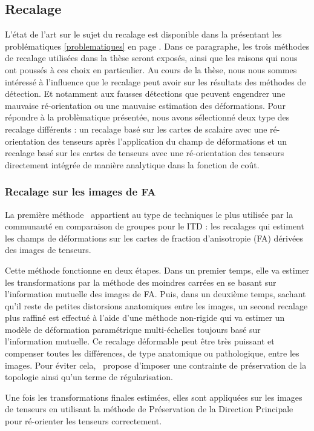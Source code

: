 \subsection{Recalage}
L'état de l'art sur le sujet du recalage est disponible dans la  présentant les problématiques \ref{problematiques} en page \pageref{problematiques}.
Dans ce paragraphe, les trois méthodes de recalage utilisées dans la thèse seront exposés, ainsi que les raisons qui nous ont poussés à ces choix en particulier. 
Au cours de la thèse, nous nous sommes intéressé à l'influence que le recalage peut avoir sur les résultats des méthodes de détection. 
Et notamment aux fausses détections que peuvent engendrer une mauvaise ré-orientation ou une mauvaise estimation des déformations.
Pour répondre à la problèmatique présentée, nous avons sélectionné deux type des recalage différents : 
un recalage basé sur les cartes de scalaire avec une ré-orientation des tenseurs après l'application du champ de déformations 
et un recalage basé sur les cartes de tenseurs avec une ré-orientation des tenseurs directement intégrée de manière analytique dans la fonction de coût.

\subsubsection*{Recalage sur les images de FA}
La première méthode~\cite{Noblet2006} appartient au type de techniques le plus utilisée par la communauté en comparaison de groupes pour le ITD : 
les recalages qui estiment les champs de déformations sur les cartes de fraction d'anisotropie (FA) dérivées des images de tenseurs.

Cette méthode fonctionne en deux étapes.
Dans un premier temps, elle va estimer les transformations par la méthode des moindres carrées en se basant sur l'information mutuelle des images de FA.
Puis, dans un deuxième temps, sachant qu'il reste de petites distorsions anatomiques entre les images, 
un second recalage plus raffiné est effectué à l'aide d'une méthode non-rigide 
qui va estimer un modèle de déformation paramétrique multi-échelles toujours basé sur l'information mutuelle.
Ce recalage déformable peut être très puissant et compenser toutes les différences, de type anatomique ou pathologique, entre les images.
Pour éviter cela,~\cite{Noblet2006} propose d'imposer une contrainte de préservation de la topologie ainsi qu'un terme de régularisation.

Une fois les transformations finales estimées, elles sont appliquées sur les images de tenseurs en utilisant la méthode de 
Préservation de la Direction Principale~\cite{Alexander2001} pour ré-orienter les tenseurs correctement.


